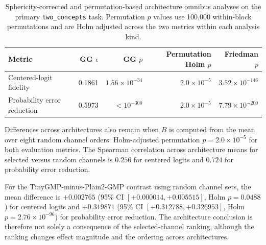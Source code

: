 \begin{table}[h]
\caption{Sphericity-corrected and permutation-based architecture omnibus analyses on the primary \texttt{two\_concepts} task. Permutation $p$ values use 100,000 within-block permutations and are Holm adjusted across the two metrics within each analysis kind.}
\label{tab:architecture-posthoc}
\centering
\footnotesize
\setlength{\tabcolsep}{3pt}
\begin{tabular}{lrrrr}
\toprule
Metric & GG $\epsilon$ & GG $p$ & Permutation Holm $p$ & Friedman $p$ \\
\midrule
Centered-logit fidelity & 0.1861 & $1.56\times10^{-34}$ & $2.0\times10^{-5}$ & $3.52\times10^{-146}$ \\
Probability error reduction & 0.5973 & $<10^{-300}$ & $2.0\times10^{-5}$ & $7.79\times10^{-200}$ \\
\bottomrule
\end{tabular}
\end{table}

Differences across architectures also remain when $B$ is computed from the mean over eight random channel orders: Holm-adjusted permutation $p=2.0\times10^{-5}$ for both evaluation metrics. The Spearman correlation across architecture means for selected versus random channels is $0.256$ for centered logits and $0.724$ for probability error reduction.

For the TinyGMP-minus-Plain2-GMP contrast using random channel sets, the mean difference is $+0.002765$ (95\% CI $[+0.000014,+0.005515]$, Holm $p=0.0488$) for centered logits and $+0.319871$ (95\% CI $[+0.312788,+0.326953]$, Holm $p=2.76\times10^{-96}$) for probability error reduction. The architecture conclusion is therefore not solely a consequence of the selected-channel ranking, although the ranking changes effect magnitude and the ordering across architectures.
